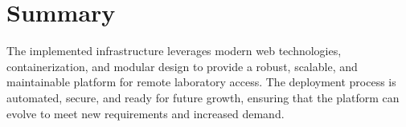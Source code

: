 \section{Summary}

The implemented infrastructure leverages modern web technologies, containerization, and modular design to provide a robust, scalable, and maintainable platform for remote laboratory access. The deployment process is automated, secure, and ready for future growth, ensuring that the platform can evolve to meet new requirements and increased demand.